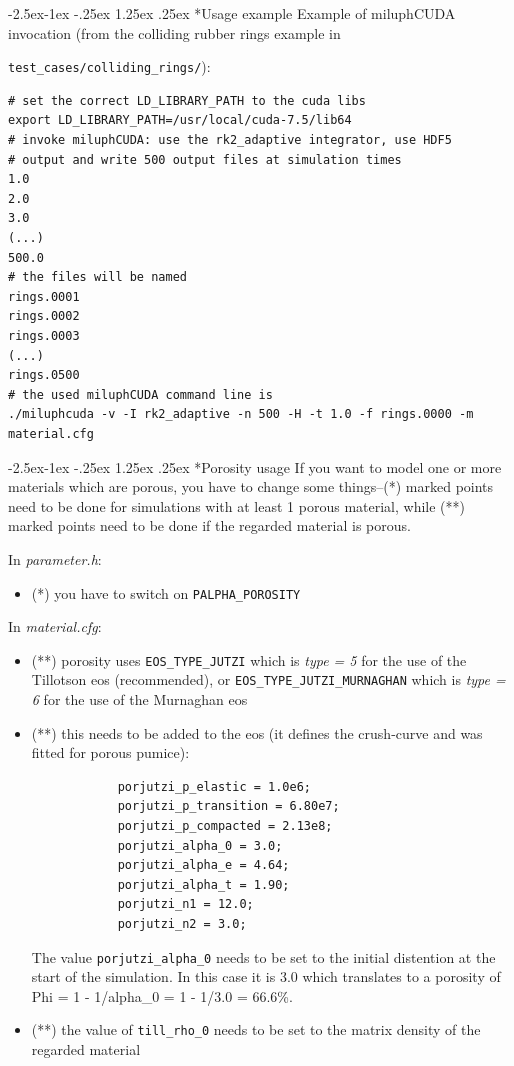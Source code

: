 \documentclass[10pt,fleqn,twoside]{article}
\makeatletter
\renewcommand\paragraph{\@startsection{paragraph}{4}{\z@}%
            {-2.5ex\@plus -1ex \@minus -.25ex}%
            {1.25ex \@plus .25ex}%
            {\normalfont\normalsize\bfseries}}
\makeatother
\begin{document}
\paragraph*{Usage example}
Example of miluphCUDA invocation (from the colliding rubber rings example in

\verb|test_cases/colliding_rings/|):

\begin{verbatim}
# set the correct LD_LIBRARY_PATH to the cuda libs
export LD_LIBRARY_PATH=/usr/local/cuda-7.5/lib64
# invoke miluphCUDA: use the rk2_adaptive integrator, use HDF5
# output and write 500 output files at simulation times
1.0
2.0
3.0
(...)
500.0
# the files will be named
rings.0001
rings.0002
rings.0003
(...)
rings.0500
# the used miluphCUDA command line is
./miluphcuda -v -I rk2_adaptive -n 500 -H -t 1.0 -f rings.0000 -m material.cfg 
\end{verbatim}



\paragraph*{Porosity usage}
If you want to model one or more materials which are porous, you have to change some things--(*) marked points need to be done for simulations with at least 1 porous material, while (**) marked points need to be done if the regarded material is porous.

In \emph{parameter.h}:
\begin{itemize}
\item (*) you have to switch on \verb|PALPHA_POROSITY|
\end{itemize}

In \emph{material.cfg}:
\begin{itemize}
\item (**) porosity uses \verb|EOS_TYPE_JUTZI| which is \emph{type = 5} for the use of the Tillotson eos (recommended), or \verb|EOS_TYPE_JUTZI_MURNAGHAN| which is \emph{type = 6} for the use of the Murnaghan eos
\item (**) this needs to be added to the eos (it defines the crush-curve and was fitted for porous pumice):
\begin{verbatim}
            porjutzi_p_elastic = 1.0e6;
            porjutzi_p_transition = 6.80e7;
            porjutzi_p_compacted = 2.13e8;
            porjutzi_alpha_0 = 3.0;
            porjutzi_alpha_e = 4.64;
            porjutzi_alpha_t = 1.90;
            porjutzi_n1 = 12.0;
            porjutzi_n2 = 3.0;
\end{verbatim}
The value \verb|porjutzi_alpha_0| needs to be set to the initial distention at the start of the simulation. In this case it is 3.0 which translates to a porosity of Phi = 1 - 1/alpha\_0 = 1 - 1/3.0 = 66.6\%.
\item (**) the value of \verb|till_rho_0| needs to be set to the matrix density of the regarded material
\end{itemize}
\end{document}
